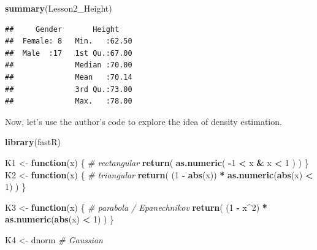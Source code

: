 \documentclass[]{book}
\newenvironment{Shaded}{\begin{snugshade}}{\end{snugshade}}
\newcommand{\KeywordTok}[1]{\textcolor[rgb]{0.13,0.29,0.53}{\textbf{#1}}}
\newcommand{\DecValTok}[1]{\textcolor[rgb]{0.00,0.00,0.81}{#1}}
\newcommand{\StringTok}[1]{\textcolor[rgb]{0.31,0.60,0.02}{#1}}
\newcommand{\CommentTok}[1]{\textcolor[rgb]{0.56,0.35,0.01}{\textit{#1}}}
\newcommand{\ControlFlowTok}[1]{\textcolor[rgb]{0.13,0.29,0.53}{\textbf{#1}}}
\newcommand{\OperatorTok}[1]{\textcolor[rgb]{0.81,0.36,0.00}{\textbf{#1}}}
\newcommand{\NormalTok}[1]{#1}
\theoremstyle{definition}
\theoremstyle{definition}
\theoremstyle{definition}
\theoremstyle{remark}
\begin{document}
\begin{Shaded}
\begin{Highlighting}[]
\KeywordTok{summary}\NormalTok{(Lesson2_Height)}
\end{Highlighting}
\end{Shaded}

\begin{verbatim}
##     Gender       Height     
##  Female: 8   Min.   :62.50  
##  Male  :17   1st Qu.:67.00  
##              Median :70.00  
##              Mean   :70.14  
##              3rd Qu.:73.00  
##              Max.   :78.00
\end{verbatim}

Now, let's use the author's code to explore the idea of density
estimation.

\begin{Shaded}
\begin{Highlighting}[]
\KeywordTok{library}\NormalTok{(fastR)}
\end{Highlighting}
\end{Shaded}

\begin{Shaded}
\begin{Highlighting}[]
\NormalTok{K1 <-}\StringTok{ }\ControlFlowTok{function}\NormalTok{(x) \{ }\CommentTok{# rectangular}
     \KeywordTok{return}\NormalTok{( }\KeywordTok{as.numeric}\NormalTok{( }\OperatorTok{-}\DecValTok{1} \OperatorTok{<}\StringTok{ }\NormalTok{x }\OperatorTok{&}\StringTok{ }\NormalTok{x }\OperatorTok{<}\StringTok{ }\DecValTok{1}\NormalTok{ ) )}
\NormalTok{\}}
\NormalTok{K2 <-}\StringTok{ }\ControlFlowTok{function}\NormalTok{(x) \{ }\CommentTok{# triangular}
     \KeywordTok{return}\NormalTok{( (}\DecValTok{1} \OperatorTok{-}\StringTok{ }\KeywordTok{abs}\NormalTok{(x)) }\OperatorTok{*}\StringTok{ }\KeywordTok{as.numeric}\NormalTok{(}\KeywordTok{abs}\NormalTok{(x) }\OperatorTok{<}\StringTok{ }\DecValTok{1}\NormalTok{) )}
\NormalTok{ \}}

\NormalTok{K3 <-}\StringTok{ }\ControlFlowTok{function}\NormalTok{(x) \{     }\CommentTok{# parabola / Epanechnikov}
      \KeywordTok{return}\NormalTok{( (}\DecValTok{1} \OperatorTok{-}\StringTok{ }\NormalTok{x}\OperatorTok{^}\DecValTok{2}\NormalTok{) }\OperatorTok{*}\StringTok{ }\KeywordTok{as.numeric}\NormalTok{(}\KeywordTok{abs}\NormalTok{(x) }\OperatorTok{<}\StringTok{ }\DecValTok{1}\NormalTok{) )}
\NormalTok{\}}

\NormalTok{K4 <-}\StringTok{ }\NormalTok{dnorm         }\CommentTok{# Gaussian}
\end{Highlighting}
\end{Shaded}
\end{document}
